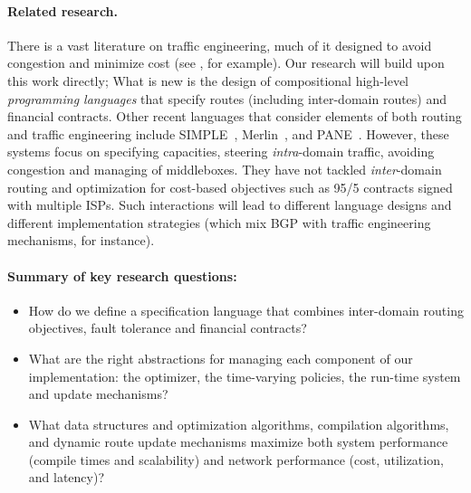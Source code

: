 
\paragraph*{Related research.}
There is a vast literature on traffic engineering, much of it designed to avoid congestion 
and minimize cost (see \cite{Awduche:traffic-engineering,Fortz:traffic-engineering,Goldenberg:multi-home}, for
example).  Our research will build upon this work directly; What is new is the design of
compositional high-level \emph{programming languages} that 
specify routes (including inter-domain routes) and financial contracts.
Other recent languages that consider elements of both routing and traffic
engineering include SIMPLE~\cite{simple},
 Merlin~\cite{foster:merlin}, and PANE~\cite{Ferguson:2013}. However, these systems focus on 
specifying capacities, steering \emph{intra}-domain traffic, avoiding congestion and
managing of middleboxes.  They have not tackled 
\emph{inter}-domain routing and optimization for cost-based objectives such as
95/5 contracts signed with multiple ISPs.
Such interactions will lead to different language designs and different implementation
strategies (which mix BGP with traffic engineering mechanisms, for instance).

\paragraph*{Summary of key research questions:}

\begin{itemize}
\item How do we define a specification language that combines inter-domain
routing objectives, fault tolerance and financial contracts?  
\item What are the right abstractions for managing each component of our implementation: 
the optimizer, the time-varying policies, the run-time system and update mechanisms?  
\item What data structures and optimization algorithms, compilation algorithms,
and dynamic route update mechanisms maximize both system performance (compile times and scalability)
and network performance (cost, utilization, and latency)?
\end{itemize}

